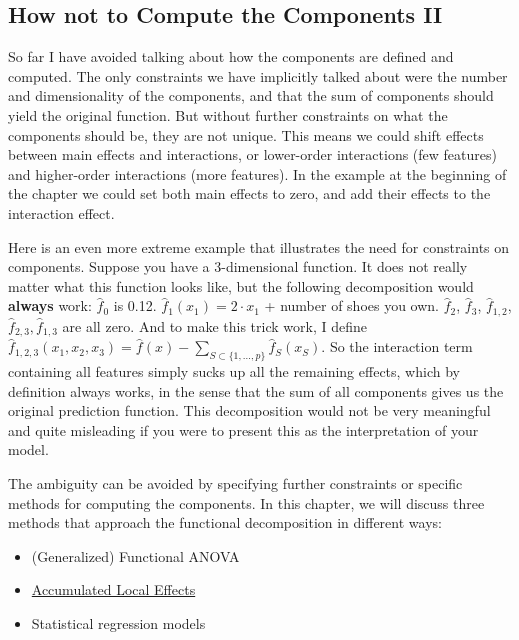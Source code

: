 \documentclass[
  10pt,
]{scrbook}
\providecommand{\tightlist}{%
  \setlength{\itemsep}{0pt}\setlength{\parskip}{0pt}}
\begin{document}
\hypertarget{how-not-to-compute-the-components-ii}{%
\subsection{How not to Compute the Components II}\label{how-not-to-compute-the-components-ii}}

So far I have avoided talking about how the components are defined and computed.
The only constraints we have implicitly talked about were the number and dimensionality of the components, and that the sum of components should yield the original function.
But without further constraints on what the components should be, they are not unique.
This means we could shift effects between main effects and interactions, or lower-order interactions (few features) and higher-order interactions (more features).
In the example at the beginning of the chapter we could set both main effects to zero, and add their effects to the interaction effect.

Here is an even more extreme example that illustrates the need for constraints on components.
Suppose you have a 3-dimensional function.
It does not really matter what this function looks like, but the following decomposition would \textbf{always} work:
\(\hat{f}_0\) is 0.12.
\(\hat{f}_1(x_1)=2\cdot{}x_1\) + number of shoes you own.
\(\hat{f}_2\), \(\hat{f}_3\), \(\hat{f}_{1,2}\), \(\hat{f}_{2,3}, \hat{f}_{1,3}\) are all zero.
And to make this trick work, I define \(\hat{f}_{1,2,3}(x_1,x_2,x_3)=\hat{f}(x)-\sum_{S\subset\{1,\ldots,p\}}\hat{f}_S(x_S)\).
So the interaction term containing all features simply sucks up all the remaining effects, which by definition always works, in the sense that the sum of all components gives us the original prediction function.
This decomposition would not be very meaningful and quite misleading if you were to present this as the interpretation of your model.

The ambiguity can be avoided by specifying further constraints or specific methods for computing the components.
In this chapter, we will discuss three methods that approach the functional decomposition in different ways:

\begin{itemize}
\tightlist
\item
  (Generalized) Functional ANOVA
\item
  \protect\hyperlink{ale}{Accumulated Local Effects}
\item
  Statistical regression models
\end{itemize}
\end{document}
